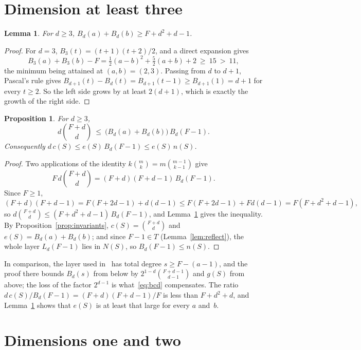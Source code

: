 \documentclass[11pt]{article}
\newtheorem{lemma}{Lemma}
\newtheorem{proposition}{Proposition}
\theoremstyle{definition}
\theoremstyle{remark}
\newcommand{\Bd}[2]{B_{#1}(#2)}
\begin{document}
\section{Dimension at least three}\label{sec:high}

\begin{lemma}\label{lem:edim}
For $d\ge3$, $\Bd{d}{a}+\Bd{d}{b}\ge F+d^2+d-1$.
\end{lemma}

\begin{proof}
For $d=3$, $\Bd{3}{t}=(t+1)(t+2)/2$, and a direct expansion gives
\[
\Bd{3}{a}+\Bd{3}{b}-F=\tfrac12(a-b)^2+\tfrac52(a+b)+2\ \ge\ 15\ >\ 11 ,
\]
the minimum being attained at $(a,b)=(2,3)$. Passing from $d$ to $d+1$, Pascal's
rule gives $\Bd{d+1}{t}-\Bd{d}{t}=\Bd{d+1}{t-1}\ge \Bd{d+1}{1}=d+1$ for every
$t\ge2$. So the left side grows by at least $2(d+1)$, which is exactly the growth
of the right side.
\end{proof}

\begin{proposition}\label{prop:high}
For $d\ge3$,
\[
d\binom{F+d}{d}\ \le\ \bigl(\Bd{d}{a}+\Bd{d}{b}\bigr)\,\Bd{d}{F-1}.
\]
Consequently $d\,c(S)\le e(S)\,\Bd{d}{F-1}\le e(S)\,n(S)$.
\end{proposition}

\begin{proof}
Two applications of the identity $k\binom{m}{k}=m\binom{m-1}{k-1}$ give
\[
F\,d\binom{F+d}{d}=(F+d)(F+d-1)\,\Bd{d}{F-1}.
\]
Since $F\ge1$,
\[
(F+d)(F+d-1)=F(F+2d-1)+d(d-1)\le F(F+2d-1)+Fd(d-1)=F(F+d^2+d-1),
\]
so $d\binom{F+d}{d}\le (F+d^2+d-1)\,\Bd{d}{F-1}$, and Lemma~\ref{lem:edim}
gives the inequality. By Proposition~\ref{prop:invariants}, $c(S)=\binom{F+d}{d}$
and $e(S)=\Bd{d}{a}+\Bd{d}{b}$; and since $F-1\in T$ (Lemma~\ref{lem:reflect}), the
whole layer $L_d(F-1)$ lies in $N(S)$, so $\Bd{d}{F-1}\le n(S)$.
\end{proof}

\noindent In comparison, the layer used in~\cite[Theorem~5.6]{bcd} has total
degree $s\ge F-(a-1)$, and the proof there bounds $\Bd{d}{s}$ from below by
$2^{1-d}\binom{F+d-1}{d-1}$ and $g(S)$ from above; the loss of the factor
$2^{d-1}$ is what~\eqref{eq:bcd} compensates. The ratio
$d\,c(S)/\Bd{d}{F-1}=(F+d)(F+d-1)/F$ is less than $F+d^2+d$, and
Lemma~\ref{lem:edim} shows that $e(S)$ is at least that large for every $a$
and~$b$.

\section{Dimensions one and two}\label{sec:low}
\end{document}
